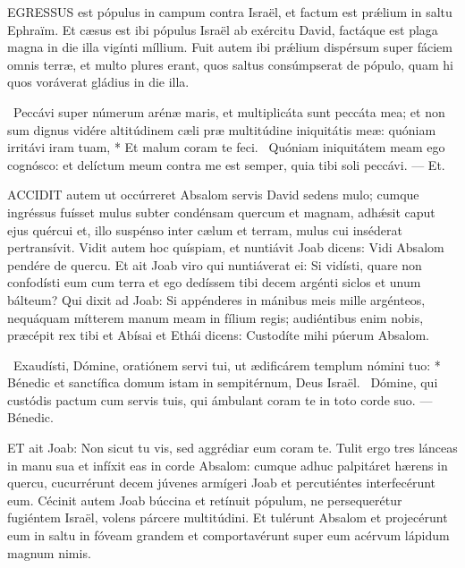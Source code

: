


\lettrine[lines=2]{E}{GRESSUS} est pópulus in campum contra Israël, et factum est prǽlium in saltu Ephraïm. Et cæsus est ibi pópulus Israël ab exércitu David, factáque est plaga magna in die illa vigínti míllium. Fuit autem ibi prǽlium dispérsum super fáciem omnis terræ, et multo plures erant, quos saltus consúmpserat de pópulo, quam hi quos voráverat gládius in die illa.

\R\ Peccávi super númerum arénæ maris, et multiplicáta sunt peccáta mea; et non sum dignus vidére altitúdinem cæli præ multitúdine iniquitátis meæ: quóniam irritávi iram tuam, * Et malum coram te feci. \V\ Quóniam iniquitátem meam ego cognósco: et delíctum meum contra me est semper, quia tibi soli peccávi. --- Et.


\lettrine[lines=2]{A}{CCIDIT} autem ut occúrreret Absalom servis David sedens mulo; cumque ingréssus fuísset mulus subter condénsam quercum et magnam, adhǽsit caput ejus quércui et, illo suspénso inter cælum et terram, mulus cui inséderat pertransívit. Vidit autem hoc quíspiam, et nuntiávit Joab dicens: Vidi Absalom pendére de quercu. Et ait Joab viro qui nuntiáverat ei: Si vidísti, quare non confodísti eum cum terra et ego dedíssem tibi decem argénti siclos et unum bálteum? Qui dixit ad Joab: Si appénderes in mánibus meis mille argénteos, nequáquam mítterem manum meam in fílium regis; audiéntibus enim nobis, præcépit rex tibi et Abísai et Ethái dicens: Custodíte mihi púerum Absalom.

\R\ Exaudísti, Dómine, oratiónem servi tui, ut ædificárem templum nómini tuo: * Bénedic et sanctífica domum istam in sempitérnum, Deus Israël. \V\ Dómine, qui custódis pactum cum servis tuis, qui ámbulant coram te in toto corde suo. --- Bénedic.



\lettrine[lines=2]{E}{T} ait Joab: Non sicut tu vis, sed aggrédiar eum coram te. Tulit ergo tres lánceas in manu sua et infíxit eas in corde Absalom: cumque adhuc palpitáret hærens in quercu, cucurrérunt decem júvenes armígeri Joab et percutiéntes interfecérunt eum. Cécinit autem Joab búccina et retínuit pópulum, ne persequerétur fugiéntem Israël, volens párcere multitúdini. Et tulérunt Absalom et projecérunt eum in saltu in fóveam grandem et comportavérunt super eum acérvum lápidum magnum nimis.


